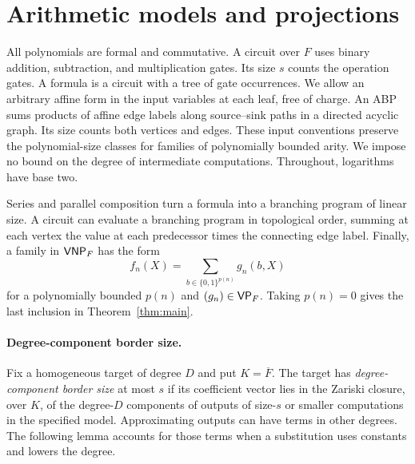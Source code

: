 \section{Arithmetic models and projections}\label{sec:notation}

All polynomials are formal and commutative. A circuit over \(F\) uses
binary addition, subtraction, and multiplication gates. Its size \(s\)
counts the operation gates. A formula is a circuit with a tree of
gate occurrences. We allow an arbitrary affine form in the input
variables at each leaf, free of charge. An ABP sums products of affine edge labels along source--sink paths in
a directed acyclic graph. Its size counts both vertices and edges. These input conventions preserve the
polynomial-size classes for families of polynomially bounded arity.
We impose no bound on the degree of intermediate computations.
Throughout, logarithms have base two.

Series and parallel composition turn a formula into a branching program
of linear size. A circuit can evaluate a branching program in
topological order, summing at each vertex the value at each predecessor
times the connecting edge label. Finally, a family in \(\mathsf{VNP}_F\) has the
form
\[
          f_n(X)=\sum_{b\in\{0,1\}^{p(n)}}g_n(b,X)
\]
for a polynomially bounded \(p(n)\) and \((g_n)\in\mathsf{VP}_F\). Taking
\(p(n)=0\) gives the last inclusion in Theorem~\ref{thm:main}.

\paragraph{Degree-component border size.}
Fix a homogeneous target of degree \(D\) and put \(K=\overline F\).
The target has \emph{degree-component border size} at most \(s\) if
its coefficient vector lies in the Zariski closure, over \(K\), of the
degree-\(D\) components of outputs of size-\(s\) or smaller computations
in the specified model. Approximating outputs can have terms in other
degrees. The following lemma accounts for those terms when a substitution
uses constants and lowers the degree.

